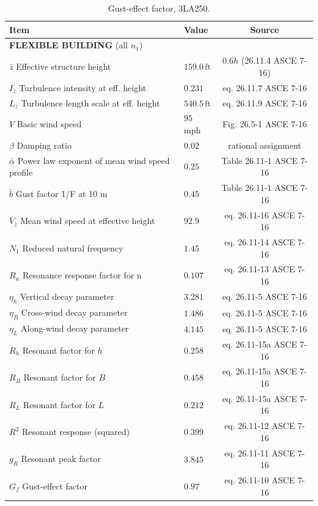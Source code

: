 \documentclass[onecolumn, fleqn]{article}
\newcommand{\ft}{\ensuremath{\,\mathrm{ft}}}
\begin{document}
\begin{table}[H]
\centering \caption{Gust-effect factor, 3LA250.}
\label{tab:gust_factor_20LA250}
\begin{tabular}{llc}
\toprule
Item		& Value		& Source		\\
\midrule
\multicolumn{3}{l}{\textbf{FLEXIBLE BUILDING} (all $n_1$)}	\\
$\bar{z}$ Effective structure height							& $159.0 \ft$					& $0.6h$ (26.11.4 ASCE 7-16)	\\
$I_{\bar{z}}$ Turbulence intensity at eff. height				& $0.231$						& eq. 26.11.7 ASCE 7-16			\\
$L_{\bar{z}}$ Turbulence length scale at eff. height			& $540.5 \ft$					& eq. 26.11.9 ASCE 7-16			\\
$V$ Basic wind speed											& $95$ mph						& Fig. 26.5-1 ASCE 7-16			\\
$\beta$ Damping ratio											& $0.02$						& rational assignment			\\
$\bar{\alpha}$ Power law exponent of mean wind speed profile	& $0.25$						& Table 26.11-1 ASCE 7-16		\\
$\bar{b}$ Gust factor 1/F at 10 m								& $0.45$						& Table 26.11-1 ASCE 7-16		\\
$\bar{V}_{\bar{z}}$ Mean wind speed at effective height			& $92.9$						& eq. 26.11-16 ASCE 7-16		\\
$N_1$ Reduced natural frequency									& $1.45$						& eq. 26.11-14 ASCE 7-16		\\
$R_n$ Resonance response factor for n							& $0.107$						& eq. 26.11-13 ASCE 7-16		\\
$\eta_h$ Vertical decay parameter								& $3.281$						& eq. 26.11-5 ASCE 7-16			\\
$\eta_B$ Cross-wind decay parameter								& $1.486$						& eq. 26.11-5 ASCE 7-16			\\
$\eta_L$ Along-wind decay parameter								& $4.145$						& eq. 26.11-5 ASCE 7-16			\\
$R_h$ Resonant factor for $h$									& $0.258$							& eq. 26.11-15a ASCE 7-16			\\
$R_B$ Resonant factor for $B$									& $0.458$							& eq. 26.11-15a ASCE 7-16			\\
$R_L$ Resonant factor for $L$									& $0.212$							& eq. 26.11-15a ASCE 7-16			\\
$R^2$ Resonant response (squared)								& $0.399$							& eq. 26.11-12 ASCE 7-16			\\
$g_R$ Resonant peak factor										& $3.845$							& eq. 26.11-11 ASCE 7-16			\\
$G_f$ Gust-effect factor										& $0.97$							& eq. 26.11-10 ASCE 7-16			\\
\bottomrule
\end{tabular}
\end{table}
\end{document}
